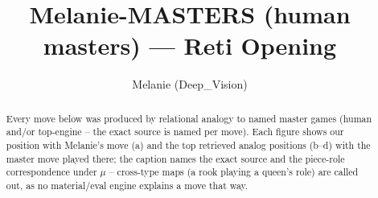\documentclass[11pt]{article}
\title{Melanie-MASTERS (human masters) — Reti Opening}
\author{Melanie (Deep\_Vision)}
\date{}
\begin{document}
\maketitle

\begin{abstract}Every move below was produced by relational analogy to named master games (human and/or top-engine -- the exact source is named per move). Each figure shows our position with Melanie's move (a) and the top retrieved analog positions (b--d) with the master move played there; the caption names the exact source and the piece-role correspondence under $\mu$ -- cross-type maps (a rook playing a queen's role) are called out, as no material/eval engine explains a move that way.\end{abstract}

\begin{figure}[p]\centering
\begin{subfigure}{0.46\textwidth}\centering
\resizebox{\linewidth}{!}{%
\newchessgame
\chessboard[
  setfen={rnbq1rk1/pp2bppp/4pn2/2pp4/2P5/1P3NPB/P2PPP1P/RNBQ1RK1 b - - 1 7},
  showmover=false,
  pgfstyle=straightmove, color=movearrow, markmove={f8-e8}
]}
\caption{}
\end{subfigure}\hfill
\begin{subfigure}{0.46\textwidth}\centering
\resizebox{\linewidth}{!}{%
\newchessgame
\chessboard[
  setfen={r1b2rk1/1pqn1pp1/p2b1p1p/2p5/3PB3/2P1B2P/PPQ1NPP1/R4RK1 b - - 1 13},
  showmover=false,
  pgfstyle=straightmove, color=movearrow, markmove={f8-e8}
]}
\caption{}
\end{subfigure}
\\[4pt]
\begin{subfigure}{0.46\textwidth}\centering
\resizebox{\linewidth}{!}{%
\newchessgame
\chessboard[
  setfen={r2q1rk1/ppp1ppbp/2n3p1/3p4/2PPb3/1PB2NP1/P2QPPBP/R4RK1 w - - 0 12},
  showmover=false,
  pgfstyle=straightmove, color=movearrow, markmove={f1-d1}
]}
\caption{}
\end{subfigure}\hfill
\begin{subfigure}{0.46\textwidth}\centering
\resizebox{\linewidth}{!}{%
\newchessgame
\chessboard[
  setfen={rn1q1rk1/1b2bppp/pp1p1n2/2pP4/P1B5/2N2N2/1PP2PPP/R1BQ1RK1 b - - 0 11},
  showmover=false,
  pgfstyle=straightmove, color=movearrow, markmove={b8-d7}
]}
\caption{}
\end{subfigure}

\end{figure}
\end{document}
